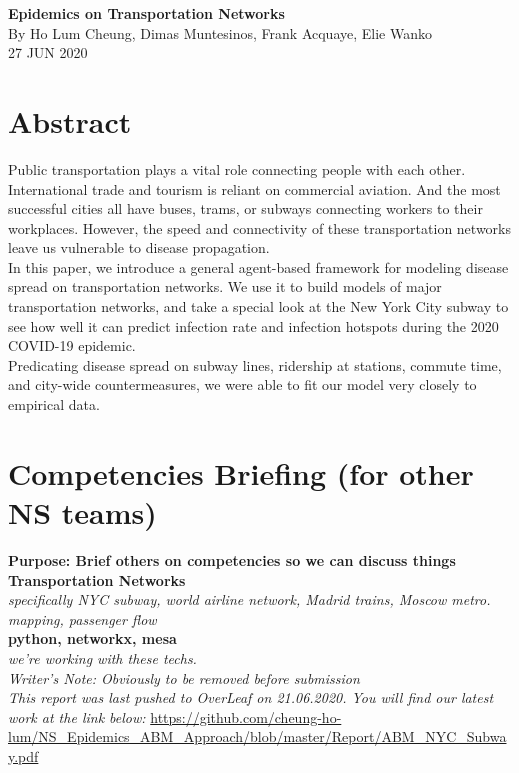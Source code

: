 \documentclass[12pt, a4, epsf] {article}
\theoremstyle{plain}
\theoremstyle{definition}
\begin{document}
\begin{center}

{\Large \textbf{Epidemics on Transportation Networks}\\}
By Ho Lum Cheung, Dimas Muntesinos, Frank Acquaye, Elie Wanko \\
27 JUN 2020
\end{center}

\section*{Abstract}
Public transportation plays a vital role connecting people with each other. International trade and tourism is reliant on commercial aviation. And the most successful cities all have buses, trams, or subways connecting workers to their workplaces. However, the speed and connectivity of these transportation networks leave us vulnerable to disease propagation.\\

In this paper, we introduce a general agent-based framework for modeling disease spread on transportation networks. We use it to build models of major transportation networks, and take a special look at the New York City subway to see how well it can predict infection rate and infection hotspots during the 2020 COVID-19 epidemic.\\

Predicating disease spread on subway lines, ridership at stations, commute time, and city-wide countermeasures, we were able to fit our model very closely to empirical data.

\section*{Competencies Briefing (for other NS teams)}
\textbf{Purpose: Brief others on competencies so we can discuss things\\}
\textbf{Transportation Networks\\}
\textit{specifically NYC subway, world airline network, Madrid trains, Moscow metro. mapping, passenger flow\\}
\textbf{python, networkx, mesa\\}
\textit{we're working with these techs.\\}
\textit{Writer's Note: Obviously to be removed before submission\\}
\textit{This report was last pushed to OverLeaf on 21.06.2020. You will find our latest work at the link below:}
\url{https://github.com/cheung-ho-lum/NS_Epidemics_ABM_Approach/blob/master/Report/ABM_NYC_Subway.pdf}
\end{document}
